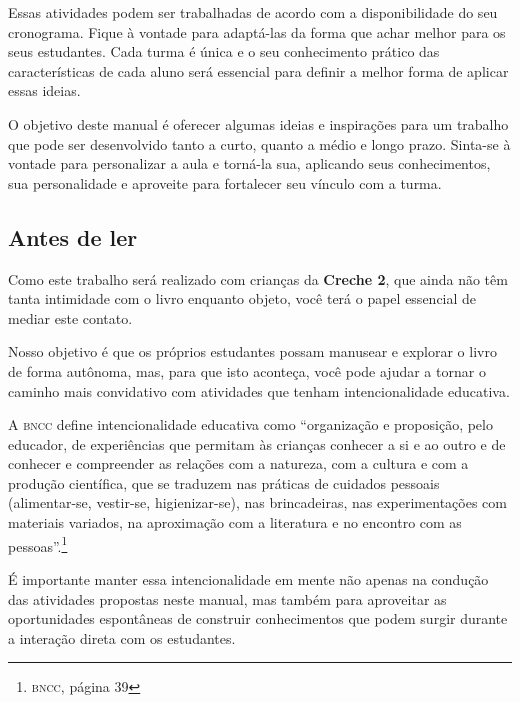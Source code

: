 \documentclass[11pt]{extarticle}
\begin{document}
Essas atividades podem ser trabalhadas de acordo com a 
disponibilidade do seu cronograma. Fique à vontade para adaptá-las 
da forma que achar melhor para os seus estudantes. Cada turma é única 
e o seu conhecimento prático das características de cada aluno será 
essencial para definir a melhor forma de aplicar essas ideias. 

O objetivo deste manual é oferecer algumas ideias 
e inspirações para um trabalho que pode ser desenvolvido tanto 
a curto, quanto a médio e longo prazo. Sinta-se à vontade para 
personalizar a aula e torná-la sua, aplicando seus conhecimentos, sua 
personalidade e aproveite para fortalecer 
seu vínculo com a turma.


\subsection{Antes de ler}


Como este trabalho será realizado com crianças da \textbf{Creche 2}, 
que ainda não têm tanta intimidade com o livro enquanto objeto, você terá o 
papel essencial de mediar este contato. 

Nosso objetivo é que os próprios estudantes possam manusear 
e explorar o livro de forma autônoma, mas, para que isto aconteça, você 
pode ajudar a tornar o caminho mais convidativo com atividades que tenham 
intencionalidade educativa. 

A \textsc{bncc} define intencionalidade educativa como ``organização 
e proposição, pelo educador, de experiências que permitam às crianças 
conhecer a si e ao outro e de conhecer e compreender as relações com a 
natureza, com a cultura e com a produção científica, que se traduzem nas 
práticas de cuidados pessoais (alimentar-se, vestir-se, higienizar-se), 
nas brincadeiras, nas experimentações com materiais 
variados, na aproximação com a literatura e no encontro com as 
pessoas''.\footnote{\textsc{bncc}, página 39}

É importante manter essa intencionalidade em mente não apenas na condução 
das atividades propostas neste manual, mas também para aproveitar as 
oportunidades espontâneas de construir conhecimentos que podem surgir durante 
a interação direta com os estudantes.
\end{document}
